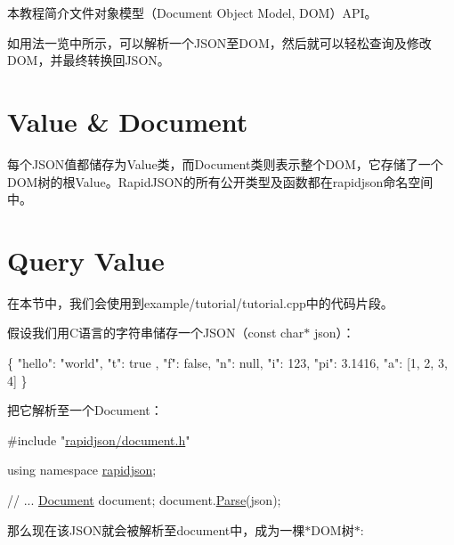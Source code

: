 本教程简介文件对象模型（\+Document Object Model, D\+O\+M）\+A\+P\+I。

如用法一览中所示，可以解析一个\+J\+S\+O\+N至\+D\+O\+M，然后就可以轻松查询及修改\+D\+O\+M，并最终转换回\+J\+S\+O\+N。\hypertarget{md_Commun_Externe_RapidJSON_doc_tutorial.zh-cn_ValueDocument}{}\section{Value \& Document}\label{md_Commun_Externe_RapidJSON_doc_tutorial.zh-cn_ValueDocument}
每个\+J\+S\+O\+N值都储存为{\ttfamily Value}类，而{\ttfamily Document}类则表示整个\+D\+O\+M，它存储了一个\+D\+O\+M树的根{\ttfamily Value}。\+Rapid\+J\+S\+O\+N的所有公开类型及函数都在{\ttfamily rapidjson}命名空间中。\hypertarget{md_Commun_Externe_RapidJSON_doc_tutorial.zh-cn_QueryValue}{}\section{Query Value}\label{md_Commun_Externe_RapidJSON_doc_tutorial.zh-cn_QueryValue}
在本节中，我们会使用到{\ttfamily example/tutorial/tutorial.\+cpp}中的代码片段。

假设我们用\+C语言的字符串储存一个\+J\+S\+O\+N（{\ttfamily const char$\ast$ json}）： 
\begin{DoxyCode}
\{
    \textcolor{stringliteral}{"hello"}: \textcolor{stringliteral}{"world"},
    \textcolor{stringliteral}{"t"}: true ,
    \textcolor{stringliteral}{"f"}: \textcolor{keyword}{false},
    \textcolor{stringliteral}{"n"}: null,
    \textcolor{stringliteral}{"i"}: 123,
    \textcolor{stringliteral}{"pi"}: 3.1416,
    \textcolor{stringliteral}{"a"}: [1, 2, 3, 4]
\}
\end{DoxyCode}


把它解析至一个{\ttfamily Document}： 
\begin{DoxyCode}
\textcolor{preprocessor}{#include "\hyperlink{document_8h}{rapidjson/document.h}"}

\textcolor{keyword}{using namespace }\hyperlink{namespacerapidjson}{rapidjson};

\textcolor{comment}{// ...}
\hyperlink{class_generic_document}{Document} document;
document.\hyperlink{class_generic_document_aebd4e7fddd80c1e1174837aee6d2159b}{Parse}(json);
\end{DoxyCode}


那么现在该\+J\+S\+O\+N就会被解析至{\ttfamily document}中，成为一棵$\ast$\+D\+O\+M树$\ast$\+:



